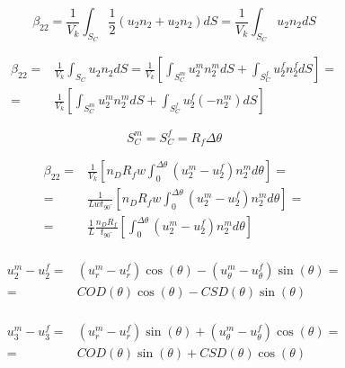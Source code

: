 \documentclass[review]{elsarticle}
\begin{document}
\begin{equation}
\beta_{22}=\frac{1}{V_{k}}\int_{S_{C}}\frac{1}{2}\left(u_{2}n_{2}+u_{2}n_{2}\right)dS=\frac{1}{V_{k}}\int_{S_{C}}u_{2}n_{2}dS
\end{equation}

\begin{equation}
\begin{aligned}
\beta_{22}=&\frac{1}{V_{k}}\int_{S_{C}}u_{2}n_{2}dS=\frac{1}{V_{k}}\left[\int_{S_{C}^{m}}u_{2}^{m}n_{2}^{m}dS+\int_{S_{C}^{f}}u_{2}^{f}n_{2}^{f}dS\right]=\\
=&\frac{1}{V_{k}}\left[\int_{S_{C}^{m}}u_{2}^{m}n_{2}^{m}dS+\int_{S_{C}^{f}}u_{2}^{f}\left(-n_{2}^{m}\right)dS\right]
\end{aligned}
\end{equation}

\begin{equation}
S_{C}^{m}=S_{C}^{f}=R_{f}\Delta\theta
\end{equation}

\begin{equation}
\begin{aligned}
\beta_{22}=&\frac{1}{V_{k}}\left[n_{D}R_{f}w\int_{0}^{\Delta\theta}\left(u_{2}^{m}-u_{2}^{f}\right)n_{2}^{m}d\theta\right]=\\
=&\frac{1}{Lwt_{90^{\circ}}}\left[n_{D}R_{f}w\int_{0}^{\Delta\theta}\left(u_{2}^{m}-u_{2}^{f}\right)n_{2}^{m}d\theta\right]=\\
=&\frac{1}{L}\frac{n_{D}R_{f}}{t_{90^{\circ}}}\left[\int_{0}^{\Delta\theta}\left(u_{2}^{m}-u_{2}^{f}\right)n_{2}^{m}d\theta\right]\\
\end{aligned}
\end{equation}

\begin{equation}
\begin{aligned}
u_{2}^{m}-u_{2}^{f}=&\left(u_{r}^{m}-u_{r}^{f}\right)\cos{\left(\theta\right)}-\left(u_{\theta}^{m}-u_{\theta}^{f}\right)\sin{\left(\theta\right)}=\\
=&COD\left(\theta\right)\cos{\left(\theta\right)}-CSD\left(\theta\right)\sin{\left(\theta\right)}\\
\end{aligned}
\end{equation}

\begin{equation}
\begin{aligned}
u_{3}^{m}-u_{3}^{f}=&\left(u_{r}^{m}-u_{r}^{f}\right)\sin{\left(\theta\right)}+\left(u_{\theta}^{m}-u_{\theta}^{f}\right)\cos{\left(\theta\right)}=\\
=&COD\left(\theta\right)\sin{\left(\theta\right)}+CSD\left(\theta\right)\cos{\left(\theta\right)}\\
\end{aligned}
\end{equation}
\end{document}
